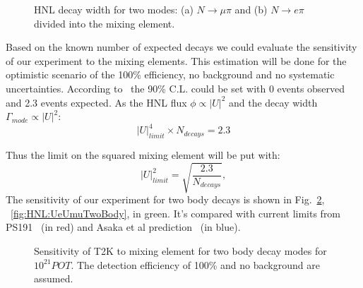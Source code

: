 \documentclass[../main.tex]{subfiles}
\begin{document}
\begin{figure}[!ht]
    \begin{minipage}[!ht]{0.49\linewidth}
    \end{minipage}
    \hfill
    \begin{minipage}[!ht]{0.49\linewidth}
    \end{minipage}
    \caption{HNL decay width for two modes: (a) $N\to \mu\pi$ and (b) $N\to e\pi$ divided into the mixing element.}
    \label{fig:HNL:decBr}
\end{figure}

Based on the known number of expected decays we could evaluate the sensitivity of our experiment to the mixing elements. This estimation will be done for the optimistic scenario of the 100\% efficiency, no background and no systematic uncertainties. According to~\cite{Cousins1992} the 90\% C.L. could be set with 0 events observed and 2.3 events expected. As the HNL flux $\phi\propto\left|U\right|^2$ and the decay width $\Gamma_{mode}\propto\left|U\right|^2$:
\begin{equation}
    \left|U\right|^4_{limit} \times N_{decays} = 2.3
\end{equation}

Thus the limit on the squared mixing element will be put with:
\begin{equation}
    \left|U\right|^2_{limit}=\sqrt{\frac{2.3}{N_{decays}}},
\end{equation}
The sensitivity of our experiment for two body decays is shown in Fig.~\ref{fig:HNL:Ue2Umu2TwoBody}, ~\ref{fig:HNL:UeUmuTwoBody}, in green. It's compared with current limits from PS191~\cite{Bernardi1988} (in red) and Asaka et al prediction~\cite{Asaka2012} (in blue).
\begin{figure}[!ht]
    \begin{minipage}[!ht]{0.49\linewidth}
    \end{minipage}
    \hfill
    \begin{minipage}[!ht]{0.49\linewidth}
    \end{minipage}
    \caption{Sensitivity of T2K to mixing element for two body decay modes for $10^{21}POT$. The detection efficiency of 100\% and no background are assumed.}
    \label{fig:HNL:Ue2Umu2TwoBody}
\end{figure}
\end{document}
